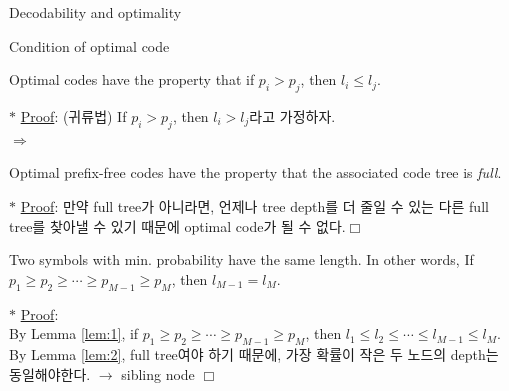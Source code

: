 \documentclass[9pt]{beamer}
\begin{document}
\begin{section}{Decodability and optimality}
        \begin{frame}{Condition of optimal code}
            \begin{lemma}\label{lem:1}
                Optimal codes have the property that if $p_i > p_j$, then $l_i \le l_j$.
            \end{lemma}
            $\ast$ \underline{Proof}: (귀류법) If $p_i > p_j$, then $l_i > l_j$라고 가정하자. 
            \\$\Rightarrow$
            \vspace{0.8cm}
            \begin{lemma}\label{lem:2}
                Optimal prefix-free codes have the property that the associated code tree is \textit{full}.
            \end{lemma}
            $\ast$ \underline{Proof}: 만약 full tree가 아니라면, 언제나 tree depth를 더 줄일 수 있는 다른 full tree를 찾아낼 수 있기 때문에 optimal code가 될 수 없다.$\Box$
            \vspace{0.2cm}
            \begin{lemma}\label{lem:3}
                Two symbols with min. probability have the same length.  In other words, If $p_1 \ge p_2 \ge \cdots \ge p_{M-1} \ge p_M$, then $l_{M-1} = l_M$.
            \end{lemma}
            $\ast$ \underline{Proof}:
            \\By Lemma \ref{lem:1}, if $p_1 \ge p_2 \ge \cdots \ge p_{M-1} \ge p_M$, then $l_1 \le l_2 \le \cdots \le l_{M-1} \le l_M$.
            \\By Lemma \ref{lem:2}, full tree여야 하기 때문에, 가장 확률이 작은 두 노드의 depth는 동일해야한다. $\rightarrow$ sibling node $\Box$
        \end{frame}
    \end{section}
\end{document}

